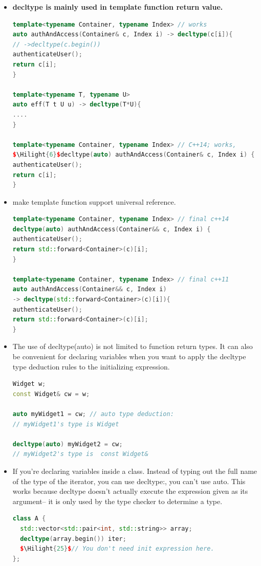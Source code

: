 \documentclass[a4paper,12pt,twoside]{book}
\newcommand{\Hilight}[1]{\makebox[0pt][l]{\color{yellow}\rule[-3pt]{#1em}{11pt}}}
\begin{document}
\begin{itemize}
\item \textbf{decltype is mainly used in template function return value.}
\begin{lstlisting}[frame=single, language=c++, mathescape=true]
template<typename Container, typename Index> // works
auto authAndAccess(Container& c, Index i) -> decltype(c[i]){
// ->decltype(c.begin())
authenticateUser();
return c[i];
}

template<typename T, typename U>
auto eff(T t U u) -> decltype(T*U){
....
}

template<typename Container, typename Index> // C++14; works,
$\Hilight{6}$decltype(auto) authAndAccess(Container& c, Index i) {
authenticateUser();
return c[i];
}
\end{lstlisting}

\item make template function support universal reference.
\begin{lstlisting}[frame=single, language=c++, mathescape=true]
template<typename Container, typename Index> // final c++14
decltype(auto) authAndAccess(Container&& c, Index i) {
authenticateUser();
return std::forward<Container>(c)[i];
}

template<typename Container, typename Index> // final c++11
auto authAndAccess(Container&& c, Index i)
-> decltype(std::forward<Container>(c)[i]){
authenticateUser();
return std::forward<Container>(c)[i];
}
\end{lstlisting}

\item The use of decltype(auto) is not limited to function return types. It can also be convenient for declaring variables when you want to apply the decltype type deduction rules to the initializing expression.
\begin{lstlisting}[frame=single, language=c++, mathescape=true]
Widget w;
const Widget& cw = w;

auto myWidget1 = cw; // auto type deduction:
// myWidget1's type is Widget

decltype(auto) myWidget2 = cw;
// myWidget2's type is  const Widget&
\end{lstlisting}

\item  If you're declaring variables inside a class. Instead of typing out the full name of the type of the iterator, you can use decltype:, you can't use auto.  This works because decltype doesn't actually execute the expression given as its argument-- it is only used by the type checker to determine a type.
\begin{lstlisting}[frame=single, language=c++, mathescape=true]
class A {
  std::vector<std::pair<int, std::string>> array;
  decltype(array.begin()) iter;
  $\Hilight{25}$// You don't need init expression here.
};
\end{lstlisting}


\end{itemize}
\end{document}
